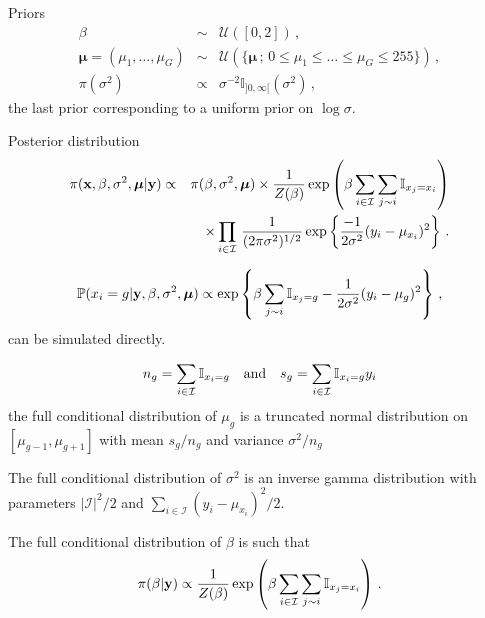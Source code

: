 \begin{slide}
Priors
\begin{eqnarray*}
 \beta                       & \sim    & \mathscr{U}([0,2])\,,\\
 \boldsymbol{\mu} = (\mu_1,\ldots,\mu_G) & \sim    & \mathscr{U}(\{\boldsymbol{\mu} \,;\,0\leq\mu_1\leq\ldots\leq\mu_G\leq 255\})\,, \\
 \pi(\sigma^2)               & \propto & \sigma^{-2}\mathbb{I}_{]0,\infty[}(\sigma^2)\,,
\end{eqnarray*}
the last prior corresponding to a uniform prior on $\log\sigma$.

\end{slide}\begin{slide}

Posterior distribution
\begin{eqnarray*}
\pi(\mathbf{x},\beta,\sigma^2,\boldsymbol{\mu}|\mathbf{y}) & \propto & \pi(\beta,\sigma^2,\boldsymbol{\mu})\times
\frac{1}{Z(\beta)}\exp\left(\beta\sum_{i\in\mathcal{I}}
\sum_{j \sim i}\mathbb{I}_{x_j=x_i}\right)\\
&& \times\prod_{i\in\mathcal{I}}\,\frac{1}{(2\pi\sigma^2)^{1/2}}
\exp\left\{\frac{-1}{2\sigma^2}(y_i-\mu_{x_i})^2\right\}\,.
\end{eqnarray*}

\end{slide}\begin{slide}

$$
\mathbb{P}(x_i=g|\mathbf{y},\beta,\sigma^2,\boldsymbol{\mu}) \propto \exp\left\{ \beta\sum_{j \sim i}\mathbb{I}_{x_j=g}-\frac{1}{2\sigma^2}(y_i-\mu_g)^2\right\}\,,
$$
can be simulated directly.

\vs \pause
$$
\displaystyle n_g=\sum_{i\in\mathcal{I}}\mathbb{I}_{x_i=g}\quad
\text{and}
\quad\displaystyle s_g=\sum_{i\in\mathcal{I}}\mathbb{I}_{x_i=g}y_i
$$
the full conditional distribution of $\mu_g$ is a truncated normal distribution on
$[\mu_{g-1},\mu_{g+1}]$ with mean $s_g/n_g$ and variance $\sigma^2/n_g$ 

\end{slide}\begin{slide}

The full conditional distribution of $\sigma^2$ is an inverse gamma distribution with
parameters $|\mathcal{I}|^2/2$ and
$\sum_{i\in\mathcal{I}}(y_i-\mu_{x_i})^2/2$. 

\vs \pause The full conditional distribution of $\beta$ is such that
$$
\pi(\beta|\mathbf{y})\propto \frac{1}{Z(\beta)}\exp\left(\beta\sum_{i\in\mathcal{I}}\sum_{j \sim i}\mathbb{I}_{x_j=x_i}\right)\,.
$$


\end{slide}

